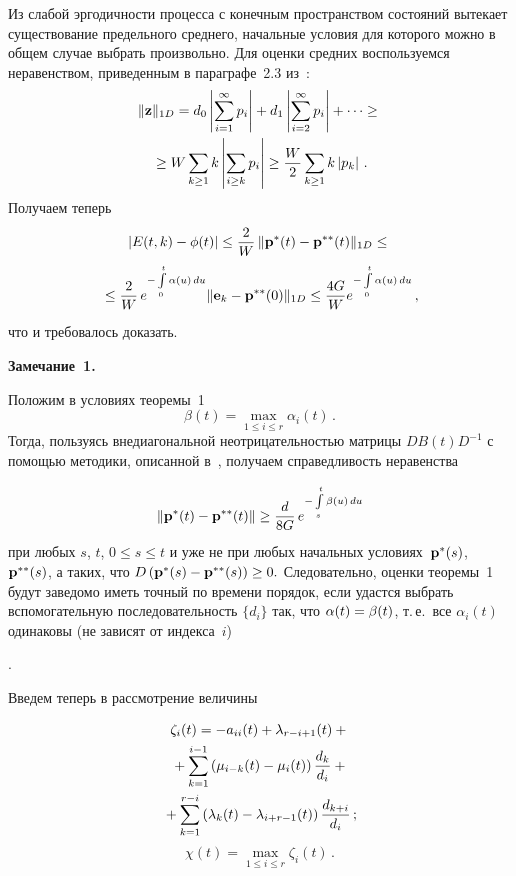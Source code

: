 \begin{multicols}{2}
Из слабой эргодичности процесса с конечным пространством состояний 
вытекает существование предельного среднего, начальные условия для которого можно 
в общем случае выбрать произвольно.
Для оценки средних воспользуемся неравенством, приведенным в параграфе~2.3 из~\cite{z08b}:
\begin{multline*}
\|{\bf z}\|_{1D} = d_0 \left|\sum\limits_{i=1}^{\infty} p_i \right|
+ d_1 \left|\sum\limits_{i=2}^{\infty} p_i \right| + \dots \ge{}\\
{}\ge 
 W \sum\limits_{k \ge 1} k \left|\sum\limits_{i \ge k} p_i\right| \ge \displaystyle\frac{\displaystyle W\mathstrut}{\displaystyle 2\mathstrut}
\sum\limits_{k \ge 1} k \left|p_k\right|\,.  
\end{multline*}
Получаем теперь
\begin{multline*}
|E(t,k)-\phi(t)|\le \displaystyle\frac{\displaystyle 2\mathstrut}{\displaystyle W\mathstrut}\,\|{\mathbf p}^*(t)-{\mathbf p}^{**}(t)\|_{1D}\le {} \\
{}\le\displaystyle\frac{\displaystyle 2\mathstrut}{\displaystyle W\mathstrut}\,e^{-\int\limits_0^t {\alpha(u)\,du}}\|{\bf e}_k -
{\mathbf p}^{**}(0)\|_{1D} \le \frac{4G}{W}e^{-\int\limits_0^t
{\alpha(u)\,du}}\,,
\end{multline*}
что и требовалось доказать.
\columnbreak


\noindent
\textbf{Замечание~1.} {Положим в условиях теоремы~1 
$$
\beta(t)=\max\limits_{1 \le i \le r}\alpha_i(t)\,.
$$ 
Тогда, пользуясь внедиагональной неотрицательностью матрицы $DB(t)D^{-1}$ 
с помощью методики, описанной в~\cite{z08b, z95b}, получаем справедливость неравенства

\noindent
\begin{equation*} 
\|{\mathbf p}^*(t)-{\mathbf p}^{**}(t)\| \ge \displaystyle\frac{\displaystyle d\mathstrut}{\displaystyle 8G\mathstrut}\,e^{-\int\limits_s^t {\beta(u)\,du}}
\end{equation*}
при любых $s$, $t$, $0\le s\le t$ и уже не при любых начальных условиях~${\bf p^*}(s)$, 
${\bf p^{**}}(s)$, а таких, что  $D\left({\bf p^*}(s) \hm-{\bf p^{**}}(s)\right) \hm\ge 0.$ 
Следовательно, оценки тео\-ре\-мы~1 будут заведомо иметь точный по времени порядок, если удастся 
выбрать вспомогательную последовательность $\{d_i\}$ так, что $\alpha(t)\hm=\beta(t)$, т.\,е.\ 
все $\alpha_i(t)$ одинаковы (не зависят от индекса~$i$)}.



\smallskip

Введем теперь в рассмотрение величины

\vspace*{-1pt}

\noindent
\begin{multline*}
\zeta_i(t)= -a_{ii}(t)+\lambda_{r-i+1}(t)+{}\\
{}+\sum\limits_{k=1}^{i-1}\left(\mu_{i-k}(t)-
\mu_i(t)\right) \displaystyle\frac{\displaystyle d_k\mathstrut}{\displaystyle d_i\mathstrut}+{}\\
{}+\sum\limits_{k=1}^{r-i}\left(\lambda_k(t)-\lambda_{i+r-1}(t)\right)\displaystyle\frac{\displaystyle d_{k+i}\mathstrut}{\displaystyle d_i\mathstrut}\,;
\end{multline*}
\begin{equation*}
\chi(t)=\max\limits_{1 \le i \le r}\zeta_i(t)\,.
\end{equation*}


\end{multicols}
